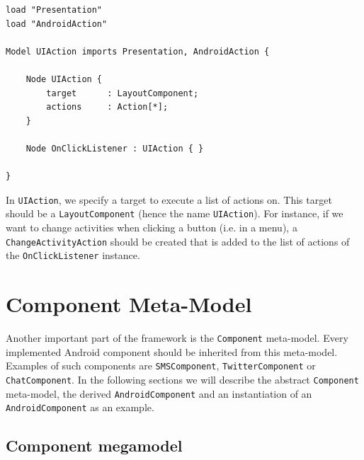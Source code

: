 \begin{lstlisting}[label=uiaction-mm,caption=UIAction meta-model, captionpos=t]
load "Presentation"
load "AndroidAction"

Model UIAction imports Presentation, AndroidAction {
	
	Node UIAction {
		target 		: LayoutComponent;
		actions 	: Action[*];
	}

	Node OnClickListener : UIAction { }

}
\end{lstlisting}
In \texttt{UIAction}, we specify a target to execute a list of actions on. This target should be a \texttt{LayoutComponent} (hence the name \texttt{UIAction}). For instance, if we want to change activities when clicking a button (i.e. in a menu), a \texttt{ChangeActivityAction} should be created that is added to the list of actions of the \texttt{OnClickListener} instance.

\section{Component Meta-Model}

Another important part of the framework is the \texttt{Component} meta-model. Every implemented Android component should be inherited from this meta-model. Examples of such components are \texttt{SMSComponent}, \texttt{TwitterComponent} or \texttt{ChatComponent}. In the following sections we will describe the abstract \texttt{Component} meta-model, the derived \texttt{AndroidComponent} and an instantiation of an \texttt{AndroidComponent} as an example.

\subsection{Component megamodel}

